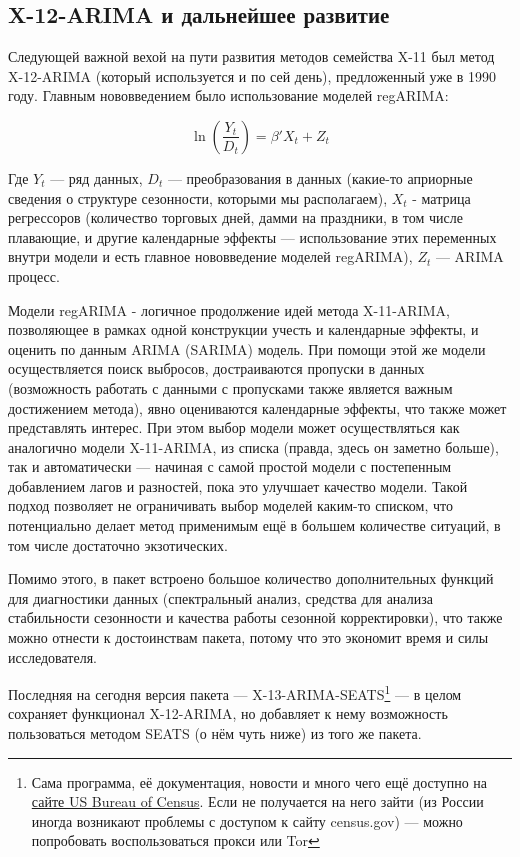 \documentclass[final,pdftex]{../../template/epsilonj}\usepackage[]{graphicx}\usepackage[]{color}
\begin{document}
\subsection{X-12-ARIMA и дальнейшее развитие}

Следующей важной вехой на пути развития методов семейства X-11 был метод X-12-ARIMA (который используется и по сей день), предложенный уже в 1990 году. Главным нововведением было использование моделей regARIMA:

\[
\ln\left(\frac{Y_t}{D_t}\right) = \beta' X_t + Z_t
\]

Где $Y_t$ --- ряд данных, $D_t$ --- преобразования в данных (какие-то априорные сведения о структуре сезонности, которыми мы располагаем), $X_t$ - матрица регрессоров (количество торговых дней, дамми на праздники, в том числе плавающие, и другие календарные эффекты --- использование этих переменных внутри модели и есть главное нововведение моделей regARIMA), $Z_t$ --- ARIMA процесс. 

Модели regARIMA - логичное продолжение идей метода X-11-ARIMA, позволяющее в рамках одной конструкции учесть и календарные эффекты, и оценить по данным ARIMA (SARIMA) модель. При помощи этой же модели осуществляется поиск выбросов, достраиваются пропуски в данных (возможность работать с данными с пропусками также является важным достижением метода), явно оцениваются календарные эффекты, что также может представлять интерес. 
При этом выбор модели может осуществляться как аналогично модели X-11-ARIMA, из списка (правда, здесь он заметно больше), так и автоматически --- начиная с самой простой модели с постепенным добавлением лагов и разностей, пока это улучшает качество модели. Такой подход позволяет не ограничивать выбор моделей каким-то списком, что потенциально делает метод применимым ещё в большем количестве ситуаций, в том числе достаточно экзотических. 

Помимо этого, в пакет встроено большое количество дополнительных функций для диагностики данных (спектральный анализ, средства для анализа стабильности сезонности и качества работы сезонной корректировки), что также можно отнести к достоинствам пакета, потому что это экономит время и силы исследователя. 

Последняя на сегодня версия пакета --- X-13-ARIMA-SEATS\footnote{Сама программа, её документация, новости и много чего ещё доступно на \href{https://www.census.gov/srd/www/x13as/}{сайте US Bureau of Census}. Если не получается на него зайти (из России иногда возникают проблемы с доступом к сайту census.gov) --- можно попробовать воспользоваться прокси или Tor} --- в целом сохраняет функционал X-12-ARIMA, но добавляет к нему возможность пользоваться методом SEATS (о нём чуть ниже) из того же пакета. 
\end{document}
